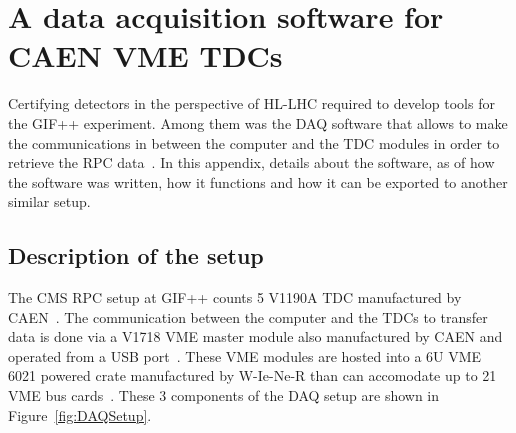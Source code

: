 \graphicspath{{chapt_dutch/}{intro/}{chapt2/}{chapt3/}{chapt4/}{chapt5/}{chapt6/}{chapt7/}}

\renewcommand\evenpagerightmark{{\scshape\small Appendix A}}
\renewcommand\oddpageleftmark{{\scshape\small A data acquisition software for VME CAEN TDCs}}

\renewcommand{\bibname}{References}

\hyphenation{}

\chapter[A data acquisition software for CAEN VME TDCs]%
{A data acquisition software for CAEN VME TDCs}
\label{app1}

Certifying detectors in the perspective of HL-LHC required to develop tools for the GIF++ experiment. Among them was the \acf{DAQ} software that allows to make the communications in between the computer and the TDC modules in order to retrieve the RPC data~\cite{GIFDAQ}. In this appendix, details about the software, as of how the software was written, how it functions and how it can be exported to another similar setup.

\section{Description of the setup}
\label{app1:sec:setup}

    The CMS RPC setup at GIF++ counts 5 V1190A \acf{TDC} manufactured by CAEN~\cite{V1190AMUT}. The communication between the computer and the TDCs to transfer data is done via a V1718 VME master module also manufactured by CAEN and operated from a USB port~\cite{V1718MUT}. These VME modules are hosted into a 6U VME 6021 powered crate manufactured by W-Ie-Ne-R than can accomodate up to 21 VME bus cards~\cite{6U6000MUT}. These 3 components of the DAQ setup are shown in Figure~\ref{fig:DAQSetup}.
    
